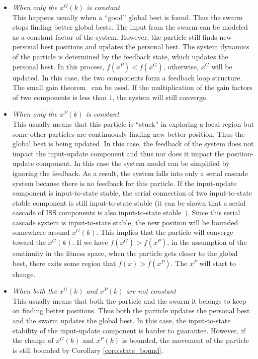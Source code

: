\documentclass{sig-alternate}
\begin{document}
\begin{itemize}
\item \emph{When only the $ x^{G} (k) $ is constant} \\
This happens usually when a ``good'' global best is found.
Thus the swarm stops finding better global bests.
The input from the swarm can be modeled as a constant factor of the system. 
However, the particle still finds new personal best positions and updates the personal best.
The system dynamics of the particle is determined by the feedback state,
which updates the personal best.
In this process, $ f(x^{P}) < f(x^{G}) $, otherwise, $ x^{G} $ will be updated.
In this case, the two components form a feedback loop structure.
The small gain theorem~\cite{Jiang2001857} can be used.
If the multiplication of the gain factors of two components is less than $ 1 $, the system will still converge.
\item \emph{When only the $ x^{P} (k) $ is constant} \\
This usually means that this particle is ``stuck'' in exploring a local region but some other particles are continuously finding new better position. 
Thus the global best is being updated.
In this case, the feedback of the system does not impact the input-update component and thus nor does it impact the position-update component.
In this case the system model can be simplified by ignoring the feedback.
As a result, the system falls into only a serial cascade system because there is no feedback for this particle.
If the input-update component is input-to-state stable, the serial connection of two input-to-state stable component is still input-to-state stable (it can be shown that a serial cascade of ISS components is also input-to-state stable~\cite{khalil1996nonlinear}).
Since this serial cascade system is input-to-state stable, the new position will be bounded somewhere around $ x^{G} (k) $. This implies that the particle will converge toward the $ x^{G} (k) $.
If we have  $ f(x^{G}) > f(x^{P}) $, in the assumption of the continuity in the fitness space, when the particle gets closer to the global best, there exits some region that $ f(x) > f(x^{P}) $.
The $ x^{P} $ will start to change.
\item \emph{When both the $ x^{G}(k) $ and $ x^{P}(k) $ are not constant} \\
This usually means that both the particle and the swarm it belongs to keep on finding better positions.
Thus both the particle updates the personal best and the swarm updates the global best.
In this case, the input-to-state stability of the input-update component is harder to guarantee.
However, if the change of $ x^{G}(k) $ and $ x^{P}(k) $ is bounded, the movement of the particle is still bounded by Corollary \ref{coro:state_bound}.
\end{itemize}
\end{document}
